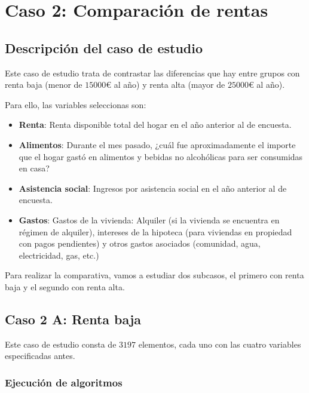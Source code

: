 
\chapter{Caso 2: Comparación de rentas}


\section{Descripción del caso de estudio}
Este caso de estudio trata de contrastar las diferencias que hay entre grupos con renta baja (menor de $15000$€ al año) y renta alta (mayor de $25000$€ al año).

Para ello, las variables seleccionas son:
\begin{itemize}
\item \textbf{Renta}: Renta disponible total del hogar en el año anterior al de encuesta.
\item \textbf{Alimentos}: Durante el mes pasado, ¿cuál fue aproximadamente el importe que el hogar gastó en alimentos y bebidas no alcohólicas para ser consumidas en casa?
\item \textbf{Asistencia social}: Ingresos por asistencia social en el año anterior al
de encuesta.
\item \textbf{Gastos}: Gastos de la vivienda: Alquiler (si la vivienda se encuentra en régimen de alquiler), intereses de la hipoteca (para viviendas en propiedad con pagos pendientes) y otros gastos asociados (comunidad, agua, electricidad, gas, etc.)
\end{itemize}

Para realizar la comparativa, vamos a estudiar dos subcasos, el primero con renta baja y el segundo con renta alta.

\section{Caso 2 A: Renta baja}

Este caso de estudio consta de $3197$ elementos, cada uno con las cuatro variables especificadas antes.

\subsection{Ejecución de algoritmos}

